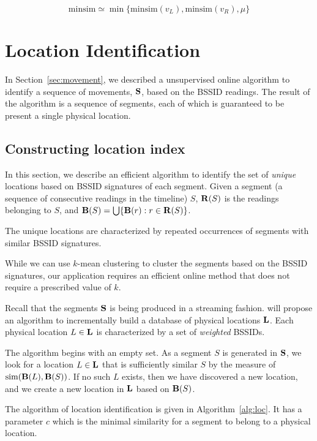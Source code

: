 $$\mathrm{minsim} \simeq \min\{\mathrm{minsim}(v_L), \mathrm{minsim}(v_R), \mu\}$$

\section{Location Identification}

\label{sec:loc}

In Section~\ref{sec:movement}, we described a unsupervised online algorithm to
identify a sequence of movements, $\mathbf{S}$, based on the BSSID readings.  The result of the
algorithm is a sequence of segments, each of which is guaranteed to be present a
single physical location.

\subsection{Constructing location index}

In this section, we describe an efficient algorithm to identify the set of {\em
unique} locations based on BSSID signatures of each segment.  Given a segment (a
sequence of consecutive readings in the timeline) $S$, $\mathbf{R}(S)$ is the readings
belonging to $S$, and $\mathbf{B}(S) = \bigcup\{\mathbf{B}(r): r\in\mathbf{R}(S)\}$.

The unique locations are characterized by repeated occurrences of segments with
similar BSSID signatures.

While we can use $k$-mean clustering to cluster the segments based on the BSSID
signatures, our application requires an efficient online method that does not
require a prescribed value of $k$.

Recall that the segments $\mathbf{S}$ is being produced in a streaming fashion.  will
propose an algorithm to incrementally build a database of physical locations
$\mathbf{L}$.  Each physical location $L\in\mathbf{L}$ is characterized by a set of {\em
weighted} BSSIDs.

The algorithm begins with an empty set.  As a segment $S$ is generated in $\mathbf{S}$, we
look for a location $L\in\mathbf{L}$ that is sufficiently similar $S$ by the measure
of $\mathrm{sim}(\mathbf{B}(L), \mathbf{B}(S))$.  If no such $L$ exists, then we have
discovered a new location, and we create a new location in $\mathbf{L}$ based on $\mathbf{B}(S)$.

The algorithm of location identification is given in Algorithm~\ref{alg:loc}.
It has a parameter $c$ which is the minimal similarity for a segment to belong
to a physical location.

